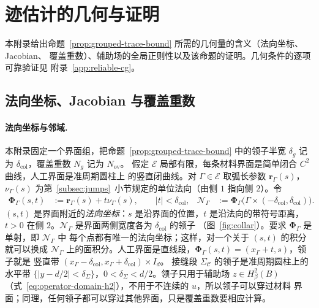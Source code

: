 \section{迹估计的几何与证明}
\label{app:trace}

本附录给出命题~\ref{prop:grouped-trace-bound} 所需的几何量的含义（法向坐标、Jacobian、
覆盖重数）、辅助场的全局正则性以及该命题的证明。几何条件的逐项可靠验证见
附录~\ref{app:reliable-cg}。

\subsection{法向坐标、Jacobian 与覆盖重数}
\label{app:trace-geometry}

\paragraph{法向坐标与邻域.}
本附录固定一个界面组，把命题~\ref{prop:grouped-trace-bound} 中的领子半宽 $\delta_g$ 记为
$\delta_{\mathrm{col}}$，覆盖重数 $N_g$ 记为 $N_{\mathrm{ov}}$。
假定 $\mathscr E$ 局部有限，每条材料界面是简单闭合 $C^2$ 曲线，人工界面是准周期圆柱上
的竖直闭曲线。对 $\Gamma\in\mathscr E$ 取弧长参数 $\boldsymbol r_\Gamma(s)$，
$\nu_\Gamma(s)$ 为第~\ref{subsec:jumps}~小节规定的单位法向（由侧 $1$ 指向侧 $2$）。令
\begin{align}
  \boldsymbol\Phi_\Gamma(s,t)
  &:=\boldsymbol r_\Gamma(s)+t\nu_\Gamma(s),
  \qquad|t|<\delta_{\mathrm{col}},
  &\mathcal N_\Gamma
  &:=\boldsymbol\Phi_\Gamma\bigl(\Gamma\times(-\delta_{\mathrm{col}},\delta_{\mathrm{col}})\bigr).
  \label{eq:interface-normal-neighborhood}
\end{align}
$(s,t)$ 是界面附近的\emph{法向坐标}：$s$ 是沿界面的位置，$t$ 是沿法向的带符号距离，
$t>0$ 在侧 $2$。$\mathcal N_\Gamma$ 是界面两侧宽度各为 $\delta_{\mathrm{col}}$ 的领子
（图~\ref{fig:collar}）。要求 $\boldsymbol\Phi_\Gamma$ 是单射，即 $\mathcal N_\Gamma$ 中
每个点都有唯一的法向坐标；这样，对一个关于 $(s,t)$ 的积分就可以换成 $\mathcal N_\Gamma$
上的面积分。人工界面是直线段，$\boldsymbol\Phi_\Gamma(s,t)=(x_\Gamma+t,s)$，领子就是
竖直带 $(x_\Gamma-\delta_{\mathrm{col}},x_\Gamma+\delta_{\mathrm{col}})\times I_d$。
接缝段 $\Sigma_{\mathcal C}$ 的领子是准周期圆柱上的
水平带 $\{|y-d/2|<\delta_\Sigma\}$，$0<\delta_\Sigma<d/2$。领子只用于辅助场 $z\in H^2_\beta(B)$
（式~\eqref{eq:operator-domain-h2}），不用于不连续的 $\widehat u$，所以领子可以穿过材料
界面；同理，任何领子都可以穿过其他界面，只是覆盖重数要相应计算。

